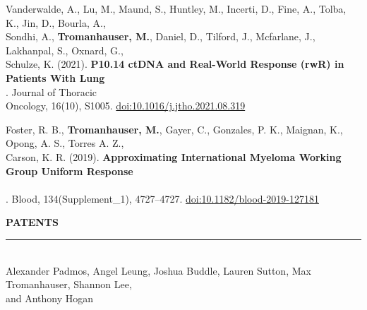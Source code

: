 \documentclass{resume} %
\begin{document}
\hspace*{1mm}Vanderwalde, A., Lu, M., Maund, S., Huntley, M., Incerti, D., Fine, A., Tolba, K., Jin, D., Bourla, A., \\
\hspace*{2mm}Sondhi, A., {\bf Tromanhauser, M.}, Daniel, D., Tilford, J., Mcfarlane, J., Lakhanpal, S., Oxnard, G., \\
\hspace*{2mm}Schulze, K. (2021). {\bf P10.14 ctDNA and Real-World Response (rwR) in Patients With Lung} \\
\hspace*{2mm}{\bf Cancer From A Prospective Real-World Clinico-Genomic (PCG) Study}. Journal of Thoracic \\
\hspace*{2mm}Oncology, 16(10), S1005. \href{https://doi.org/10.1016/j.jtho.2021.08.319}{doi:10.1016/j.jtho.2021.08.319}

\hspace*{1mm}Foster, R. B., {\bf Tromanhauser, M.}, Gayer, C., Gonzales, P. K., Maignan, K., Opong, A. S., Torres A. Z., \\
\hspace*{2mm}Carson, K. R. (2019). {\bf Approximating International Myeloma Working Group Uniform Response} \\
\hspace*{2mm}{\bf Criteria to Derive Response for Multiple Myeloma (MM) Patients Using Data from Electronic} \\
\hspace*{2mm}{\bf Health Records (EHR)}. Blood, 134(Supplement\_1), 4727–4727. \href{https://doi.org/10.1182/blood-2019-127181}{doi:10.1182/blood-2019-127181}
\fi


\medskip
\MakeUppercase{{\bf Patents}}
\medskip
\hrule

\hspace*{1mm}{\bf Systems and methods for managing clinical trials.} \\
\hspace*{1mm}Alexander Padmos, Angel Leung, Joshua Buddle, Lauren Sutton, Max Tromanhauser, Shannon
Lee, \\
\hspace*{1mm}and Anthony Hogan \\
\hspace*{1mm}{\em Patent No.: US11742061B2. Publication Date: Aug 29, 2023}
\end{document}
